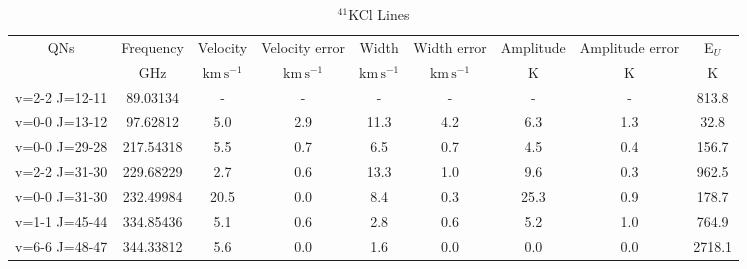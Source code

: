 \begin{table*}[htp]
\centering
\caption{$^{41}$KCl Lines}
\begin{tabular}{ccccccccc}
\label{tab:41KCl_salt_lines}
QNs & Frequency & Velocity & Velocity error & Width & Width error & Amplitude & Amplitude error & E$_U$ \\
 & $\mathrm{GHz}$ & $\mathrm{km\,s^{-1}}$ & $\mathrm{km\,s^{-1}}$ & $\mathrm{km\,s^{-1}}$ & $\mathrm{km\,s^{-1}}$ & $\mathrm{K}$ & $\mathrm{K}$ & $\mathrm{K}$ \\
\hline
v=2-2 J=12-11 & 89.03134 & - & - & - & - & - & - & 813.8 \\
v=0-0 J=13-12 & 97.62812 & 5.0 & 2.9 & 11.3 & 4.2 & 6.3 & 1.3 & 32.8 \\
v=0-0 J=29-28 & 217.54318 & 5.5 & 0.7 & 6.5 & 0.7 & 4.5 & 0.4 & 156.7 \\
v=2-2 J=31-30 & 229.68229 & 2.7 & 0.6 & 13.3 & 1.0 & 9.6 & 0.3 & 962.5 \\
v=0-0 J=31-30 & 232.49984 & 20.5 & 0.0 & 8.4 & 0.3 & 25.3 & 0.9 & 178.7 \\
v=1-1 J=45-44 & 334.85436 & 5.1 & 0.6 & 2.8 & 0.6 & 5.2 & 1.0 & 764.9 \\
v=6-6 J=48-47 & 344.33812 & 5.6 & 0.0 & 1.6 & 0.0 & 0.0 & 0.0 & 2718.1 \\
\hline
\end{tabular}

\par 
\end{table*}
